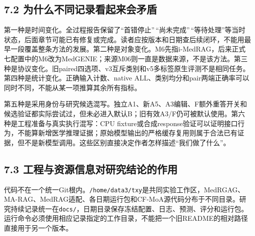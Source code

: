 \documentclass[
  11pt,
  a4paper,
]{article}
\begin{document}
\subsection{7.2
为什么不同记录看起来会矛盾}\label{ux4e3aux4ec0ux4e48ux4e0dux540cux8bb0ux5f55ux770bux8d77ux6765ux4f1aux77dbux76fe}

第一种是时间变化。全过程报告保留了``首错停止''\,``尚未完成''\,``等待处理''等当时状态，后面章节可能已有修复或完成。读者应按版本和日期查后续闭环，不能用最早一段覆盖整条方法的发展。第二种是对象变化。M6先指i-MedRAG，后来正式七配置中的M6改为MedGENIE；来源M06则一直是数据来源，不是该方法。第三种是协议变化。旧paired四选项、v3互斥类别和v5多标签原生评测不是相同任务。第四种是统计变化。正确输入计数、native
ALL、类别均分和pair两端正确率可以同时不同，不能从某一项推算其余所有指标。

第五种是采用身份与研究候选混写。独立A1、新A5、A3编辑、F额外重答开关和候选验证都实际尝试过，但未必进入默认B；旧有效A3/F仍可被默认使用。第六种是工程准备与真实执行混写：CPU
fixture或合成response验证可以证明接口行为，不能算新增医学推理证据；原始模型输出的严格缓存复用则属于合法已有证据，但不是新模型调用。这些区别直接决定作者怎样描述``我们做了什么''。

\subsection{7.3
工程与资源信息对研究结论的作用}\label{ux5de5ux7a0bux4e0eux8d44ux6e90ux4fe1ux606fux5bf9ux7814ux7a76ux7ed3ux8bbaux7684ux4f5cux7528}

代码不在一个统一Git根内。\texttt{/\allowbreak{}home/\allowbreak{}data3/\allowbreak{}txy}是共同实验工作区，MedRGAG、MA-RAG、MedRAG适配、各日期运行包和CF-MoA源代码分布于不同目录。研究持续记录统一在\texttt{docs/\allowbreak{}}，日期目录保存冻结配置、日志、预测、评分和运行包。运行命令必须使用相应记录指定的工作目录，不能把一个旧README的相对路径直接用于另一个版本。
\end{document}
